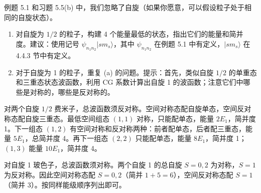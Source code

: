 \begin{question}
例题 5.1 和习题 5.5(b) 中，我们忽略了自旋（如果你愿意，可以假设粒子处于相同的自旋状态）。
\begin{enumerate}
\item 对自旋为 $1/2$ 的粒子，构建 4 个能量最低的状态，指出它们的能量和简并度。建议：使用记号 $\psi_{n_1n_2}|s m_s\rangle$，其中 $\psi_{n_1n_2}$ 在例题 5.1 中有定义，$|s m_s\rangle$ 在 4.4.3 节中有定义。
\item 对于自旋为 1 的粒子，重复 (a) 的问题。提示：首先，类似自旋 $1/2$ 的单重态和三重态状态波函数，利用 CG 系数计算出自旋 1 的波函数；注意它们中哪些是对称的，哪些是反对称的。
\end{enumerate}
\end{question}
\begin{solution}

对两个自旋 $1/2$ 费米子，总波函数须反对称。空间对称态配自旋单态，空间反对称态配自旋三重态。最低空间组态 $(1,1)$ 对称，只能配单态，能量 $2E_1$，简并度 1。下一组态 $(1,2)$ 有空间对称和反对称两种：前者配单态，后者配三重态，能量 $5E_1$，总简并度 4。再下一组态 $(2,2)$ 只能配单态，能量 $8E_1$，简并度 1；$(1,3)$ 能量 $10E_1$，简并度 4。

对自旋 1 玻色子，总波函数须对称。两个自旋 1 的总自旋 $S=0,2$ 为对称，$S=1$ 为反对称。因此空间对称态配 $S=0,2$（简并 $1+5=6$），空间反对称态配 $S=1$（简并 3）。按同样能级顺序列出即可。

\end{solution}

